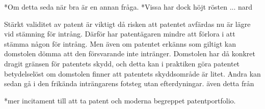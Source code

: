 *Om detta seda när bra är en annan fråga. 
*Vissa har dock höjt rösten ... nard

Stärkt validitet av patent är viktigt då risken att patentet avfärdas nu är lägre vid stämning för
intrång. Därför har patentägaren mindre att förlora i att stämma någon för intrång. Men
även om patentet erkänns som giltigt kan domstolen dömma att den försvarande inte intränger.
Domstolen har då konkret dragit gränsen för patentets skydd, och detta kan i praktiken göra patentet
betydelselöst om domstolen finner att patentets skyddsområde är litet. Andra kan sedan gå i den frikända
inträngarens fotsteg utan efterdyningar. även detta från \cite{henry}

*mer incitament till att ta patent och moderna begreppet patentportfolio. 

